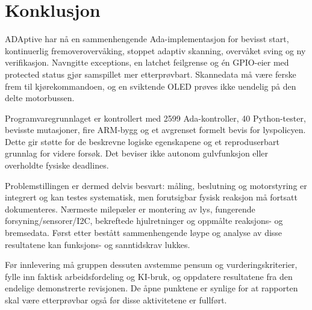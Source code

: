 \chapter{Konklusjon}
ADAptive har nå en sammenhengende Ada-implementasjon for bevisst start,
kontinuerlig fremoverovervåking, stoppet adaptiv skanning, overvåket sving
og ny verifikasjon. Navngitte exceptions, en latchet feilgrense og én
GPIO-eier med protected status gjør samspillet mer etterprøvbart. Skannedata
må være ferske frem til kjørekommandoen, og en sviktende OLED prøves ikke
uendelig på den delte motorbussen.

Programvaregrunnlaget er kontrollert med 2599 Ada-kontroller, 40 Python-tester,
bevisste mutasjoner, fire ARM-bygg og et avgrenset formelt bevis for
lyspolicyen. Dette gir støtte for de beskrevne logiske egenskapene og et
reproduserbart grunnlag for videre forsøk. Det beviser ikke autonom
gulvfunksjon eller overholdte fysiske deadlines.

Problemstillingen er dermed delvis besvart: måling, beslutning og motorstyring
er integrert og kan testes systematisk, men forutsigbar fysisk reaksjon må
fortsatt dokumenteres. Nærmeste milepæler er montering av lys, fungerende
forsyning/sensorer/I2C, bekreftede hjulretninger og oppmålte reaksjons- og
bremsedata. Først etter bestått sammenhengende løype og analyse av disse
resultatene kan funksjons- og sanntidskrav lukkes.

Før innlevering må gruppen dessuten avstemme pensum og vurderingskriterier,
fylle inn faktisk arbeidsfordeling og KI-bruk, og oppdatere resultatene fra
den endelige demonstrerte revisjonen. De åpne punktene er synlige for at
rapporten skal være etterprøvbar også før disse aktivitetene er fullført.
